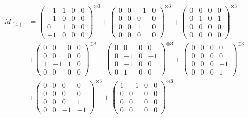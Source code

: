 \documentclass{article}
\newcommand{\Mthree}{%
    M_{(4)}
}
\begin{document}
{
\footnotesize
    \begin{align}
        \Mthree
        &= \label{Rs16_Rc11_Solutions_Solution_6-c1} \begin{pmatrix} -1 & 1 & 0 & 0 \\ -1 & 0 & 0 & 0 \\ 0 & 1 & 0 & 0 \\ -1 & 0 & 0 & 0 \end{pmatrix}^{\otimes 3} 
            + \begin{pmatrix} 0 & 0 & -1 & 0 \\ 0 & 0 & 0 & 0 \\ 0 & 0 & 1 & 0 \\ 0 & 0 & 0 & 0 \end{pmatrix}^{\otimes 3} 
            + \begin{pmatrix} 0 & 0 & 0 & 0 \\ 0 & 1 & 0 & 1 \\ 0 & 0 & 0 & 0 \\ 0 & 0 & 0 & 0 \end{pmatrix}^{\otimes 3} \\
        &+ \label{Rs16_Rc11_Solutions_Solution_6-c4} \begin{pmatrix} 0 & 0 & 0 & 0 \\ 0 & 0 & 0 & 0 \\ 1 & -1 & 1 & 0 \\ 0 & 0 & 0 & 0 \end{pmatrix}^{\otimes 3} 
            + \begin{pmatrix} 0 & 0 & 0 & 0 \\ 0 & -1 & 0 & -1 \\ 0 & -1 & 0 & 0 \\ 0 & 1 & 0 & 0 \end{pmatrix}^{\otimes 3} 
            + \begin{pmatrix} 0 & 0 & 0 & 0 \\ 0 & 0 & 0 & 0 \\ 0 & 0 & 0 & -1 \\ 0 & 0 & 0 & 1 \end{pmatrix}^{\otimes 3} \\
        &+ \label{Rs16_Rc11_Solutions_Solution_6-c7} \begin{pmatrix} 0 & 0 & 0 & 0 \\ 0 & 0 & 0 & 0 \\ 0 & 0 & 0 & 1 \\ 0 & 0 & -1 & -1 \end{pmatrix}^{\otimes 3} 
            + \begin{pmatrix} 1 & -1 & 0 & 0 \\ 0 & 0 & 0 & 0 \\ 0 & 0 & 0 & 0 \\ 0 & 0 & 0 & 0 \end{pmatrix}^{\otimes 3} 

\end{align}}
\end{document}
